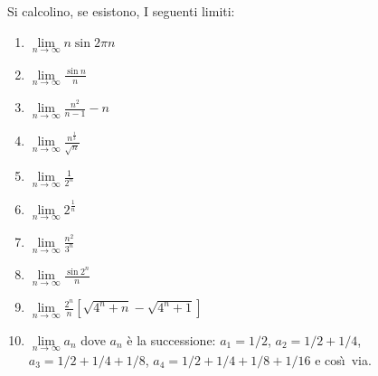 \documentclass[12pt]{article}
\begin{document}
\large
Si calcolino, se esistono, I seguenti limiti:
\begin{enumerate}
\item $\lim\limits_{n\to\infty} n\sin 2\pi n$
\item $\lim\limits_{n\to\infty}\frac {\sin n}{n}$
\item $\lim\limits_{n\to\infty} \frac{n^2}{n-1}-n$
\item $\lim\limits_{n\to\infty} \frac {n^{\frac 13}}{\sqrt{n}}$
\item $\lim\limits_{n\to\infty} \frac 1{2^n}$
\item $\lim\limits_{n\to\infty} 2^{\frac 1n}$
\item $\lim\limits_{n\to\infty} \frac {n^2}{3^n}$
\item $\lim\limits_{n\to\infty} \frac{\sin 2^n}{n}$
\item $\lim\limits_{n\to\infty} \frac
{2^n}{n}\left[\sqrt{4^n+n}-\sqrt{4^n+1}\right]$ 
\item $\lim\limits_{n\to\infty}a_n$ dove $a_n$ \`e la successione:
$a_1=1/2$, $a_2=1/2+1/4$, $a_3=1/2+1/4+1/8$, $a_4=1/2+1/4+1/8+1/16$ e
cos\`\i\ via.
\end{enumerate}
\end{document}
